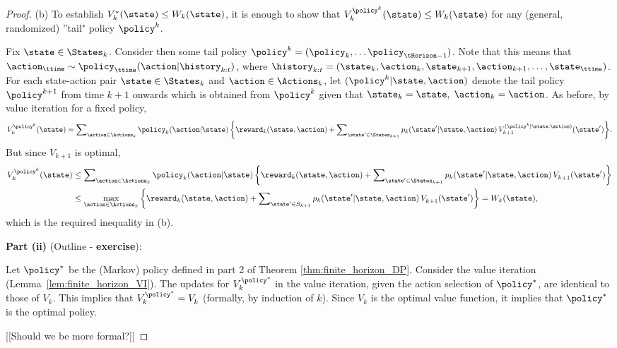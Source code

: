 \begin{proof}
(b) To establish $V_k^{*}(\state) \le {W_k}(\state)$, it is enough
to show that $V_k^{{\policy ^k}}(\state) \le {W_k}(\state)$ for any
(general, randomized) ''tail" policy ${\policy ^k}$.

Fix $\state \in {\States_k}$. Consider then some tail policy ${\policy ^k} =
({\policy _k}, \ldots {\policy _{\tHorizon -1}})$. Note that this
means that ${\action_\ttime} \sim {\policy
_\ttime}(\action|{\history_{k:t}})$, where ${\history_{k:t}} =
({\state_k},{\action_k},{\state_{k + 1}},{\action_{k + 1}}, \ldots
,{\state_\ttime})$. For each state-action pair $\state \in
{\States_k}$ and $\action \in {\Actions_k}$, let $({\policy
^k}|\state,\action)$ denote the tail policy ${\policy ^{k + 1}}$
from time $k + 1$ onwards which is obtained from ${\policy ^k}$
given that ${\state_k} = \state,\;{\action_k} = \action$. As before,
by value iteration for a fixed policy,
\[V_k^{{\policy ^k}}(\state) = \sum\nolimits_{\action \in {\Actions_k}} {{\policy _k}(\action|\state)\left\{ {{\reward_k}(\state,\action) + \sum\nolimits_{\state' \in {\States_{k + 1}}} {{p_k}(\state'|\state,\action)} \,V_{k + 1}^{({\policy ^k}|\state,\action)}(\state')} \right\}} .\]
But since $V_{k + 1}^{}$ is optimal,
\begin{align*}
V_k^{{\policy ^k}}(\state) &\le \sum\nolimits_{\action \in {\Actions_k}} {{\policy _k}(\action|\state)\left\{ {{\reward_k}(\state,\action) + \sum\nolimits_{\state' \in {\States_{k + 1}}} {{p_k}(\state'|\state,\action)\,} V_{k + 1}^{}(\state')} \right\}} \\
 &\le {\max _{\action \in {\Actions_k}}}\left\{ {{\reward_k}(\state,\action) + \sum\nolimits_{\state' \in {S_{k + 1}}} {{p_k}(\state'|\state,\action)\,} V_{k + 1}^{}(\state')} \right\} = {W_k}(\state),
\end{align*}
which is the required inequality in (b).

\textbf{Part  (ii)} (Outline - \textbf{exercise}):

Let ${\policy ^*}$ be the (Markov) policy defined in part 2 of
Theorem \ref{thm:finite_horizon_DP}.
%
Consider the value iteration (Lemma~\ref{lem:finite_horizon_VI}).
The updates for
 $V_k^{{\policy ^*}}$ in the value iteration, given the action selection of $\policy^*$, are identical to those of $V_k^{}$. This implies that $V_k^{{\policy ^*}} =
V_k^{}$ (formally, by induction of $k$). Since $V_k$ is the optimal value function, it implies that $\policy^*$ is the optimal policy.

[[Should we be more formal?]]
\end{proof}



